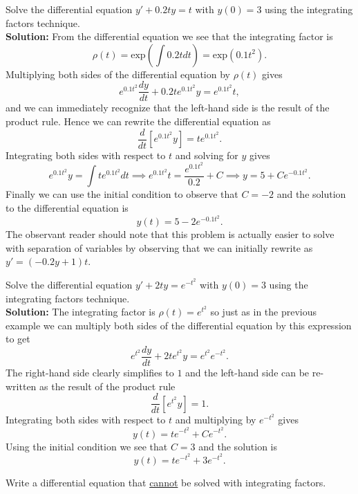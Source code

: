 \begin{example}
    Solve the differential equation $y' + 0.2ty = t$ with $y(0) = 3$ using the integrating
    factors technique.\\
    {\bf Solution: } From the differential equation we see that the integrating factor is
    \[ \rho(t) = \text{exp}\left( \int 0.2t dt \right) =
        \text{exp}\left( 0.1t^2 \right). \]
    Multiplying both sides of the differential equation by $\rho(t)$ gives
    \[ e^{0.1t^2} \frac{dy}{dt} + 0.2 t e^{0.1t^2} y = e^{0.1t^2} t, \]
    and we can immediately recognize that the left-hand side is the result of the product
    rule.  Hence we can rewrite the differential equation as
    \[ \frac{d}{dt}\left[ e^{0.1t^2} y \right] = te^{0.1t^2}. \]
    Integrating both sides with respect to $t$ and solving for $y$ gives 
    \[ e^{0.1t^2} y = \int t e^{0.1t^2} dt \implies e^{0.1t^2} t = \frac{e^{0.1t^2}}{0.2}
        + C \implies y = 5 + C e^{-0.1t^2}. \]
    Finally we can use the initial condition to observe that $C = -2$ and the solution to
    the differential equation is 
    \[ \boxed{y(t) = 5 - 2 e^{-0.1t^2}. } \]
    The observant reader should note that this problem is actually easier to solve with
    separation of variables by observing that we can initially rewrite as $y' = (-0.2y + 1
    )t$.
\end{example}

\begin{example}
    Solve the differential equation $y' + 2ty = e^{-t^2}$ with $y(0) = 3$ using the
    integrating factors technique. \\
    {\bf Solution:} The integrating factor is $\rho(t) = e^{t^2}$ so just as in the
    previous example we can multiply both sides of the differential equation by this
    expression to get 
    \[ e^{t^2} \frac{dy}{dt} + 2te^{t^2} y = e^{t^2} e^{-t^2}. \]
    The right-hand side clearly simplifies to $1$ and the left-hand side can be
    re-written as the result of the product rule
    \[ \frac{d}{dt} \left[ e^{t^2} y \right] = 1. \]
    Integrating both sides with respect to $t$ and multiplying by $e^{-t^2}$ gives
    \[ y(t) = te^{-t^2} + Ce^{-t^2}. \]
    Using the initial condition we see that $C = 3$ and the solution is
    \[ \boxed{y(t) = te^{-t^2} + 3e^{-t^2}.} \]
\end{example}

\begin{problem}
    Write a differential equation that \underline{cannot} be solved with integrating
    factors.
\end{problem}

